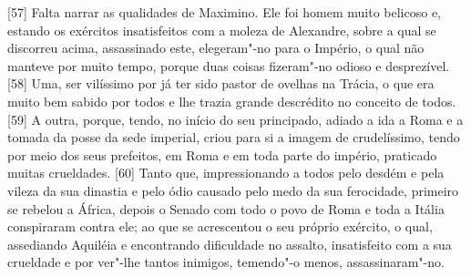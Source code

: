 {[}57{]} Falta narrar as qualidades de Maximino. Ele foi homem muito
belicoso e, estando os exércitos insatisfeitos com a moleza de
Alexandre, sobre a qual se discorreu acima, assassinado este,
elegeram"-no para o Império, o qual não manteve por muito tempo, porque
duas coisas fizeram"-no odioso e desprezível. {[}58{]} Uma, ser vilíssimo
por já ter sido pastor de ovelhas na Trácia, o que era muito bem sabido
por todos e lhe trazia grande descrédito no conceito de todos. {[}59{]}
A outra, porque, tendo, no início do seu principado, adiado a ida a Roma
e a tomada da posse da sede imperial, criou para si a imagem de
crudelíssimo, tendo por meio dos seus prefeitos, em
Roma e em toda parte do império, praticado muitas crueldades. {[}60{]}
Tanto que, impressionando a todos pelo desdém e pela vileza da sua
dinastia e pelo ódio causado pelo medo da sua ferocidade, primeiro se
rebelou a África, depois o Senado com todo o povo de Roma e toda a
Itália conspiraram contra ele; ao que se acrescentou o seu próprio
exército, o qual, assediando Aquiléia e encontrando dificuldade no
assalto, insatisfeito com a sua crueldade e por ver"-lhe tantos inimigos,
temendo"-o menos, assassinaram"-no.

